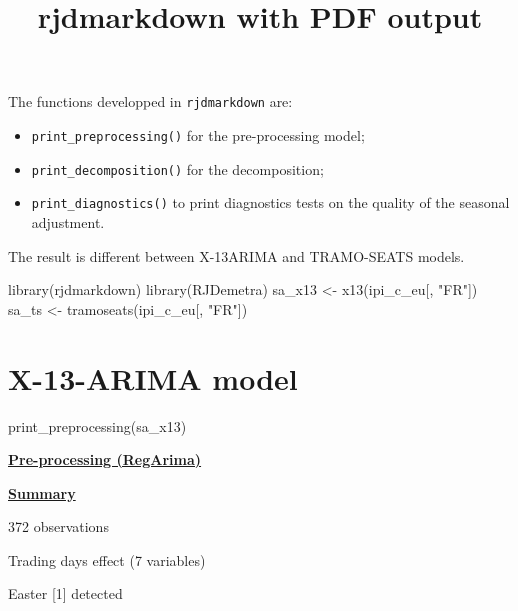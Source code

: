 \documentclass[
]{article}
\title{rjdmarkdown with PDF output}
\author{}
\date{\vspace{-2.5em}}
\newenvironment{Shaded}{\begin{snugshade}}{\end{snugshade}}
\newcommand{\FunctionTok}[1]{\textcolor[rgb]{0.00,0.00,0.00}{#1}}
\newcommand{\NormalTok}[1]{#1}
\newcommand{\OtherTok}[1]{\textcolor[rgb]{0.56,0.35,0.01}{#1}}
\newcommand{\StringTok}[1]{\textcolor[rgb]{0.31,0.60,0.02}{#1}}
\providecommand{\tightlist}{%
  \setlength{\itemsep}{0pt}\setlength{\parskip}{0pt}}
\begin{document}
\maketitle

The functions developped in \texttt{rjdmarkdown} are:

\begin{itemize}
\tightlist
\item
  \texttt{print\_preprocessing()} for the pre-processing model;\\
\item
  \texttt{print\_decomposition()} for the decomposition;\\
\item
  \texttt{print\_diagnostics()} to print diagnostics tests on the
  quality of the seasonal adjustment.
\end{itemize}

The result is different between X-13ARIMA and TRAMO-SEATS models.

\begin{Shaded}
\begin{Highlighting}[]
\FunctionTok{library}\NormalTok{(rjdmarkdown)}
\FunctionTok{library}\NormalTok{(RJDemetra)}
\NormalTok{sa\_x13 }\OtherTok{\textless{}{-}} \FunctionTok{x13}\NormalTok{(ipi\_c\_eu[, }\StringTok{"FR"}\NormalTok{])}
\NormalTok{sa\_ts }\OtherTok{\textless{}{-}} \FunctionTok{tramoseats}\NormalTok{(ipi\_c\_eu[, }\StringTok{"FR"}\NormalTok{])}
\end{Highlighting}
\end{Shaded}

\hypertarget{x-13-arima-model}{%
\section{X-13-ARIMA model}\label{x-13-arima-model}}

\begin{Shaded}
\begin{Highlighting}[]
\FunctionTok{print\_preprocessing}\NormalTok{(sa\_x13)}
\end{Highlighting}
\end{Shaded}

\underline{\textbf{Pre-processing (RegArima)}}

\underline{\textbf{Summary}}

372 observations

Trading days effect (7 variables)

Easter {[}1{]} detected
\end{document}
